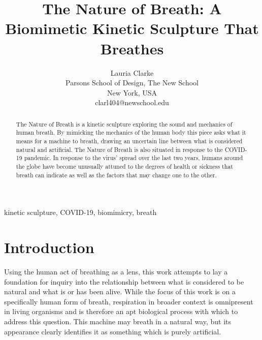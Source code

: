 \documentclass[letterpaper]{article}
\title{The Nature of Breath: A Biomimetic Kinetic Sculpture That Breathes}
\author{Lauria Clarke\\ Parsons School of Design, The New School\\ New York, USA\\ clarl404@newschool.edu\\
\newline
\newline
}
\begin{document}
 
\maketitle

\begin{abstract}
The Nature of Breath is a kinetic sculpture exploring the sound and mechanics of human breath. By mimicking the mechanics of the human body this piece asks what it means for a machine to breath, drawing an uncertain line between what is considered natural and artificial. The Nature of Breath is also situated in response to the COVID-19 pandemic. In response to the virus' spread over the last two years, humans around the globe have become unusually attuned to the degrees of health or sickness that breath can indicate as well as the factors that may change one to the other. 
\end{abstract}

kinetic sculpture, COVID-19, biomimicry, breath
\section{Introduction}



Using the human act of breathing as a lens, this work attempts to lay a foundation for inquiry into the relationship between what is considered to be natural and what is or has been alive. While the focus of this work is on a specifically human form of breath, respiration in broader context is omnipresent in living organisms and is therefore an apt biological process with which to address this question. This machine may breath in a natural way, but its appearance clearly identifies it as something which is purely artificial.


\end{document}
